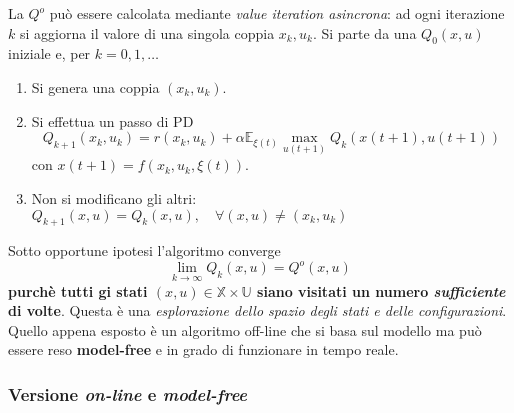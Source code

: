 La $Q^o$ pu\`o essere calcolata mediante \textit{value iteration asincrona}: ad ogni iterazione $k$ si aggiorna il valore di una singola coppia $x_k, u_k$. Si parte da una $Q_0(x,u)$ iniziale e, per $k=0,1,\dots$
\begin{enumerate}
\item Si genera una coppia $(x_k, u_k)$.
\item Si effettua un passo di PD
    \begin{equation}
    Q_{k+1}(x_k, u_k) = r(x_k,u_k) + \alpha \mathbb{E}_{\xi(t)} \max_{u(t+1)} Q_k (x(t+1), u(t+1))
    \end{equation} con $x(t+1) = f(x_k, u_k, \xi(t))$.
\item Non si modificano gli altri: $Q_{k+1} (x, u) = Q_k(x,u), \quad \forall (x,u) \neq (x_k, u_k)$
\end{enumerate}
Sotto opportune ipotesi l'algoritmo converge
\begin{equation}
\lim_{k \to \infty} Q_k(x, u) = Q^o (x,u)
\end{equation} \textbf{purch\`e tutti gi stati $(x,u) \in \mathbb{X} \times \mathbb{U}$ siano visitati un numero \textit{sufficiente} di volte}. Questa \`e una \textit{esplorazione dello spazio degli stati e delle configurazioni}. Quello appena esposto \`e un algoritmo off-line che si basa sul modello ma pu\`o essere reso \textbf{model-free} e in grado di funzionare in tempo reale.

\subsubsection{Versione \textit{on-line} e \textit{model-free}}

